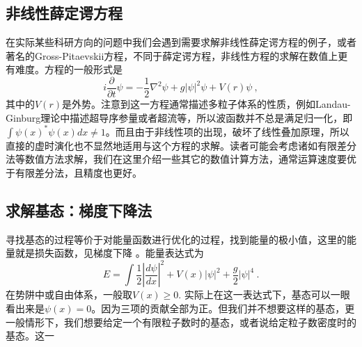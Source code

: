 
\begin{issues}
\issueTODO
\end{issues}

\subsection{非线性薛定谔方程}
在实际某些科研方向的问题中我们会遇到需要求解非线性薛定谔方程的例子，或者著名的Gross-Pitaevskii方程，不同于薛定谔方程，非线性方程的求解在数值上更有难度。方程的一般形式是
\begin{equation}
i \frac{\partial}{\partial t} \psi = -\frac{1}{2}\nabla^2 \psi + g |\psi|^2 \psi + V(r)\psi~,
\end{equation}
其中的$V(r)$是外势。注意到这一方程通常描述多粒子体系的性质，例如Landau-Ginburg理论中描述超导序参量或者超流等，所以波函数并不总是满足归一化，即$\int \psi(x)^*\psi(x) dx \neq 1$。而且由于非线性项的出现，破坏了线性叠加原理，所以直接的虚时演化也不显然地适用与这个方程的求解。读者可能会考虑诸如有限差分法等数值方法求解，我们在这里介绍一些其它的数值计算方法，通常运算速度要优于有限差分法，且精度也更好。
\subsection{求解基态：梯度下降法}
寻找基态的过程等价于对能量函数进行优化的过程，找到能量的极小值，这里的能量就是损失函数，见梯度下降 。能量表达式为
\begin{equation}
E = \int \frac{1}{2}|\frac{d \psi}{dx}|^2 + V(x)|\psi|^2 + \frac{g}{2}|\psi|^4~.
\end{equation}
在势阱中或自由体系，一般取$V(x)\ge 0$. 实际上在这一表达式下，基态可以一眼看出来是$\psi(x) = 0$。因为三项的贡献全部为正。但我们并不想要这样的基态，更一般情形下，我们想要给定一个有限粒子数时的基态，或者说给定粒子数密度时的基态。这一
